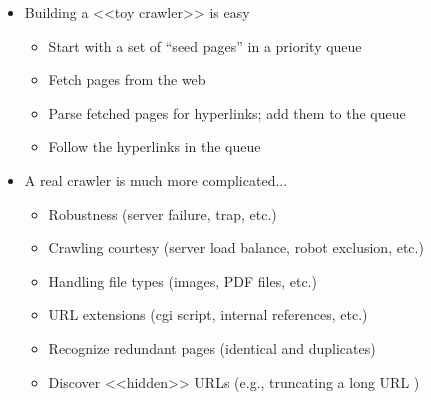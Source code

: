 \begin{itemize}
\item Building a <<toy crawler>> is easy
\begin{itemize}
\item Start with a set of “seed pages” in a priority queue
\item Fetch pages from the web
\item Parse fetched pages for hyperlinks; add them to the queue 
\item Follow the hyperlinks in the queue
\end{itemize}

\item A real crawler is much more complicated... 
\begin{itemize}
\item Robustness (server failure, trap, etc.)
\item Crawling courtesy (server load balance, robot exclusion, etc.) 
\item Handling file types (images, PDF files, etc.)
\item URL extensions (cgi script, internal references, etc.)
\item Recognize redundant pages (identical and duplicates)
\item Discover <<hidden>> URLs (e.g., truncating a long URL )
\end{itemize}
\end{itemize}

